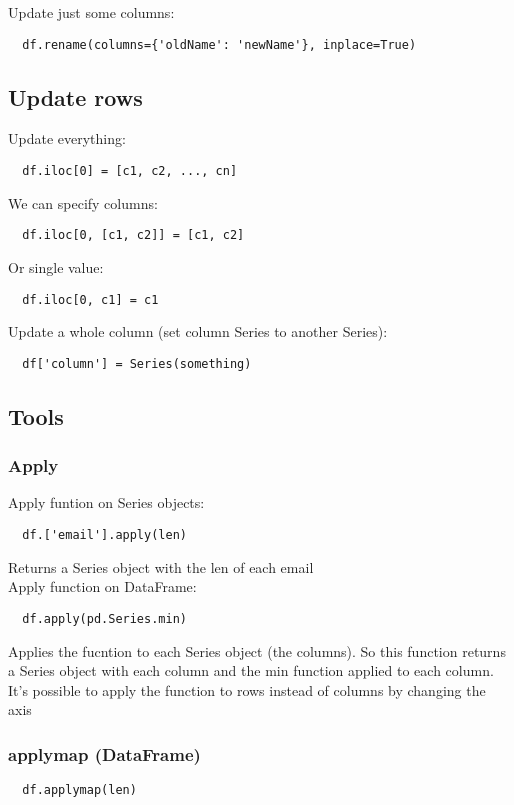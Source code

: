 \documentclass[french]{article}
\begin{document}
Update just some columns:
\begin{verbatim}
  df.rename(columns={'oldName': 'newName'}, inplace=True)
\end{verbatim}

\subsection{Update rows}

Update everything:
\begin{verbatim}
  df.iloc[0] = [c1, c2, ..., cn]
\end{verbatim}

We can specify columns:
\begin{verbatim}
  df.iloc[0, [c1, c2]] = [c1, c2]
\end{verbatim}

Or single value:
\begin{verbatim}
  df.iloc[0, c1] = c1
\end{verbatim}

Update a whole column (set column Series to another Series):
\begin{verbatim}
  df['column'] = Series(something)
\end{verbatim}

\subsection{Tools}
\subsubsection{Apply}

Apply funtion on Series objects:
\begin{verbatim}
  df.['email'].apply(len)
\end{verbatim}
Returns a Series object with the len of each email\\

Apply function on DataFrame:
\begin{verbatim}
  df.apply(pd.Series.min)
\end{verbatim}
Applies the fucntion to each Series object (the columns). So this function returns a Series object with each column and the min function applied to each column.\\

It's possible to apply the function to rows instead of columns by changing the axis

\subsubsection{applymap (DataFrame)}
\begin{verbatim}
  df.applymap(len)
\end{verbatim}
\end{document}
